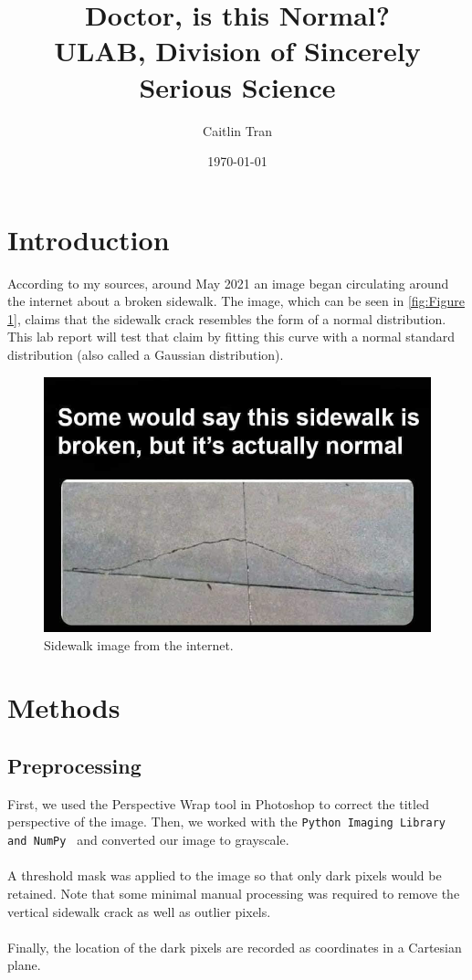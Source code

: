 \documentclass{article}
\title{Doctor, is this Normal? \\
    \large ULAB, Division of Sincerely Serious Science}
\author{Caitlin Tran}  %
\date{\today}  %
\begin{document}
\maketitle  %
\section{Introduction}
According to my sources, around May 2021 an image began circulating around the internet about a broken sidewalk. The image, which can be seen in \autoref{fig:Figure 1}, claims that the sidewalk crack resembles the form of a normal distribution. This lab report will test that claim by fitting this curve with a normal standard distribution (also called a Gaussian distribution).

\begin{figure} [H]
    \centering
    \includegraphics[width=0.8\linewidth]{figure1.jpeg}
    \caption{Sidewalk image from the internet.}
    \label{fig:Figure 1}
    \end{figure}

\section{Methods}
\subsection{Preprocessing}
First, we used the Perspective Wrap tool in Photoshop to correct the titled perspective of the image. Then, we worked with the \texttt{Python Imaging Library and NumPy \cite{2020NumPy-Array}} and converted our image to grayscale. 
\\
\\
A threshold mask was applied to the image so that only dark pixels would be retained. Note that some minimal manual processing was required to remove the vertical sidewalk crack as well as outlier pixels. 
\\
\\
Finally, the location of the dark pixels are recorded as coordinates in a Cartesian plane.
\end{document}
